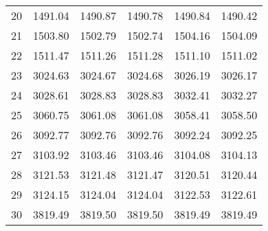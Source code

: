 \documentclass[10pt,oneside]{article}
\begin{document}
\begin{table}[h!]
\begin{tabular}{cccccc}
20 &   1491.04 & 1490.87 &    1490.78 & 1490.84 &   1490.42 \\
21 &   1503.80 & 1502.79 &    1502.74 & 1504.16 &   1504.09 \\
22 &   1511.47 & 1511.26 &    1511.28 & 1511.10 &   1511.02 \\
23 &   3024.63 & 3024.67 &    3024.68 & 3026.19 &   3026.17 \\
24 &   3028.61 & 3028.83 &    3028.83 & 3032.41 &   3032.27 \\
25 &   3060.75 & 3061.08 &    3061.08 & 3058.41 &   3058.50 \\
26 &   3092.77 & 3092.76 &    3092.76 & 3092.24 &   3092.25 \\
27 &   3103.92 & 3103.46 &    3103.46 & 3104.08 &   3104.13 \\
28 &   3121.53 & 3121.48 &    3121.47 & 3120.51 &   3120.44 \\
29 &   3124.15 & 3124.04 &    3124.04 & 3122.53 &   3122.61 \\
30 &   3819.49 & 3819.50 &    3819.50 & 3819.49 &   3819.49 \\
\bottomrule
\end{tabular}
\end{table}
\end{document}
